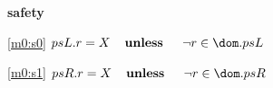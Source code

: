 \textbf{safety}
\begin{block}
\item[ \eqref{m0:s0} ]{$psL.r = X  \textbf{\quad unless \quad} \neg r \in \dom.psL $} %
\item[ \eqref{m0:s1} ]{$psR.r = X  \textbf{\quad unless \quad} \neg r \in \dom.psR $} %
\end{block}
